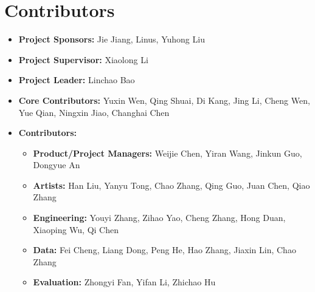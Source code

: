 \newpage
\section*{Contributors} %
\label{sec:contributors}


\begin{itemize}[leftmargin=0.25cm]
    \item \textbf{Project Sponsors:} Jie Jiang, Linus, Yuhong Liu
    \item \textbf{Project Supervisor:} Xiaolong Li
    \item \textbf{Project Leader:} Linchao Bao
    \item \textbf{Core Contributors:} Yuxin Wen, Qing Shuai, Di Kang, Jing Li, Cheng Wen, Yue Qian, Ningxin Jiao, Changhai Chen
    \item \textbf{Contributors:} 
    
    \begin{itemize}[leftmargin=0.5cm]
        \item \textbf{Product/Project Managers:} Weijie Chen, Yiran Wang, Jinkun Guo, Dongyue An
        \item \textbf{Artists:} Han Liu, Yanyu Tong, Chao Zhang, Qing Guo, Juan Chen, Qiao Zhang
        \item \textbf{Engineering:} Youyi Zhang, Zihao Yao, Cheng Zhang, Hong Duan, Xiaoping Wu, Qi Chen
        \item \textbf{Data:} Fei Cheng, Liang Dong, Peng He, Hao Zhang, Jiaxin Lin, Chao Zhang
        \item \textbf{Evaluation:} Zhongyi Fan, Yifan Li, Zhichao Hu
    \end{itemize}
\end{itemize}

